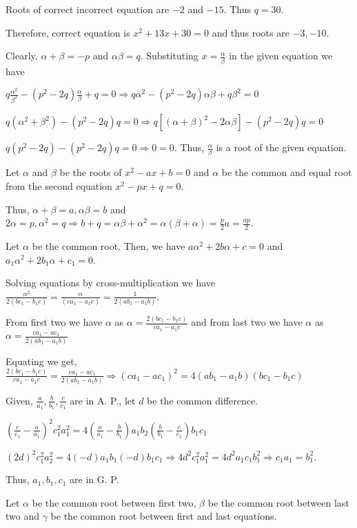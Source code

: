   Roots of correct incorrect equation are $-2$ and $-15.$ Thus $q = 30$.

  Therefore, correct equation is $x^2 + 13x + 30 = 0$ and thus roots are $-3, -10$.
\item Clearly, $\alpha + \beta = -p$ and $\alpha\beta = q$. Substituting $x = \frac{\alpha}{\beta}$ in the
  given equation we have

  $q\frac{\alpha^2}{\beta^2} - (p^2 - 2q)\frac{\alpha}{\beta} + q = 0 \Rightarrow q\alpha^2 - (p^2 -
  2q)\alpha\beta + q\beta^2 = 0$

  $q(\alpha^2 + \beta^2) - (p^2 - 2q)q = 0 \Rightarrow q[(\alpha + \beta)^2 - 2\alpha\beta] - (p^2 - 2q)q = 0$

  $q(p^2 - 2q) - (p^2 - 2q)q = 0 \Rightarrow 0 = 0$. Thus, $\frac{\alpha}{\beta}$ is a root of the given
  equation.
\item Let $\alpha$ and $\beta$ be the roots of $x^2 - ax + b = 0$ and $\alpha$ be the common and equal root
  from the second equation $x^2 - px + q = 0$.

  Thus, $\alpha + \beta = a, \alpha\beta = b$ and $2\alpha = p, \alpha^2 = q\Rightarrow b + q =
  \alpha\beta + \alpha^2 = \alpha(\beta + \alpha) = \frac{p}{2}a = \frac{ap}{2}$.
\item Let $\alpha$ be the common root. Then, we have $a\alpha^2 + 2b\alpha + c = 0$ and $a_1\alpha^2 + 2b_1\alpha + c_1 = 0$.

  Solving equations by cross-multiplication we have $\frac{\alpha^2}{2(bc_1 - b_1c)} = \frac{\alpha}{(ca_1 -
    a_1c)} = \frac{1}{2(ab_1 - a_1b)}$.

  From first two we have $\alpha$ as $\alpha = \frac{2(bc_1 - b_1c)}{ca_1 - a_1c}$ and from last two we have
  $\alpha$ as $\alpha = \frac{ca_1 - ac_1}{2(ab_1 - a_1b)}$

  Equating we get, $\frac{2(bc_1 - b_1c)}{ca_1 - a_1c} = \frac{ca_1 - ac_1}{2(ab_1 - a_1b)}\Rightarrow (ca_1
  - ac_1)^2 = 4(ab_1 - a_1b)(bc_1 - b_1c)$

  Given, $\frac{a}{a_1}, \frac{b}{b_1}, \frac{c}{c_1}$ are in A. P., let $d$ be the common difference.

  $\left(\frac{c}{c_1} - \frac{a}{a_1}\right)^2c_1^2a_1^2 = 4\left(\frac{a}{a_1} -
  \frac{b}{b_1}\right)a_1b_2\left(\frac{b}{b_1} - \frac{c}{c_1}\right)b_1c_1$

  $(2d)^2c_1^2a_2^2 = 4(-d)a_1b_1(-d)b_1c_1\Rightarrow 4d^2c_1^2a_1^2 = 4d^2a_1c_1b_1^2 \Rightarrow c_1a_1 =
  b_1^2$.

  Thus, $a_1, b_1, c_1$ are in G. P.
\item Let $\alpha$ be the common root between first two, $\beta$ be the common root between last two and $\gamma$ be
  the common root between first and last equations.

